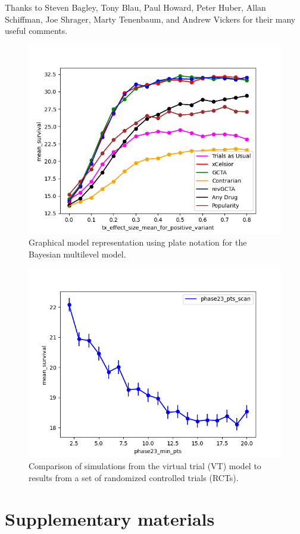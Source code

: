 \documentclass[12pt]{article}
\begin{document}
Thanks to Steven Bagley, Tony Blau, Paul Howard, Peter Huber, Allan
Schiffman, Joe Shrager, Marty Tenenbaum, and Andrew Vickers for their
many useful comments.


\clearpage

\begin{figure}
  \centering
  \includegraphics[width=\linewidth]{figs/TheFullMonty=gctaall_n=1000@20210512_0029_303720_x=tx_effect_size_mean_for_positive_variant.png}
  \caption{
    Graphical model representation using plate notation for the Bayesian multilevel model.
  }
  \label{fig:f1}
\end{figure}

\begin{figure}
  \centering
  \includegraphics[width=\linewidth]{figs/Phase23_n_patients=phase23_pts_scan_n=1000@20210512_1529_541140_x=phase23_min_pts.png}
  \caption{
    Comparison of simulations from the virtual trial (VT) model to results from a set of randomized controlled trials (RCTs).
  }
  \label{fig:f2}
\end{figure}

\clearpage

\section*{Supplementary materials}
\end{document}
